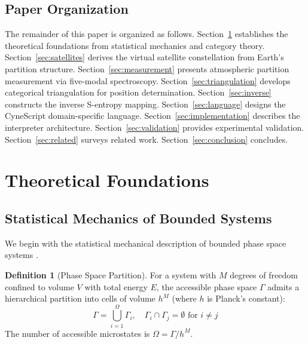\documentclass[twocolumn,10pt,a4paper]{article}
\theoremstyle{definition}
\newtheorem{definition}[theorem]{Definition}
\theoremstyle{remark}
\begin{document}
\subsection{Paper Organization}

The remainder of this paper is organized as follows. Section~\ref{sec:theory} establishes the theoretical foundations from statistical mechanics and category theory. Section~\ref{sec:satellites} derives the virtual satellite constellation from Earth's partition structure. Section~\ref{sec:measurement} presents atmospheric partition measurement via five-modal spectroscopy. Section~\ref{sec:triangulation} develops categorical triangulation for position determination. Section~\ref{sec:inverse} constructs the inverse S-entropy mapping. Section~\ref{sec:language} designs the CyneScript domain-specific language. Section~\ref{sec:implementation} describes the interpreter architecture. Section~\ref{sec:validation} provides experimental validation. Section~\ref{sec:related} surveys related work. Section~\ref{sec:conclusion} concludes.

\section{Theoretical Foundations}
\label{sec:theory}

\subsection{Statistical Mechanics of Bounded Systems}

We begin with the statistical mechanical description of bounded phase space systems \cite{landau1980statistical,reif1965fundamentals}.

\begin{definition}[Phase Space Partition]
\label{def:phase_partition}
For a system with $M$ degrees of freedom confined to volume $V$ with total energy $E$, the accessible phase space $\Gamma$ admits a hierarchical partition into cells of volume $h^M$ (where $h$ is Planck's constant):
\begin{equation}
    \Gamma = \bigcup_{i=1}^{\Omega} \Gamma_i, \quad \Gamma_i \cap \Gamma_j = \emptyset \text{ for } i \neq j
\end{equation}
The number of accessible microstates is $\Omega = \Gamma / h^M$.
\end{definition}
\end{document}
